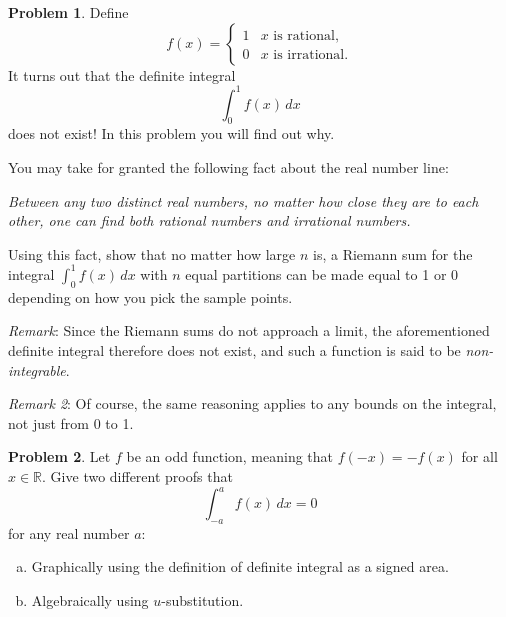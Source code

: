 \documentclass[11pt,oneside]{amsart}
\theoremstyle{definition}
\newtheorem{problem}{Problem}
\newcommand{\bR}{\mathbb{R}}
\begin{document}

    
    \begin{problem}
        Define
        \[f(x)=\begin{cases}1 &\text{$x$ is rational},\\0 &\text{$x$ is irrational}.\end{cases}\]
        It turns out that the definite integral
        \[\int_0^1f(x)\,dx\]
        does not exist! In this problem you will find out why.

        You may take for granted the following fact about the real number line:

        \emph{Between any two distinct real numbers, no matter how close they are to each other, one can find both rational numbers and irrational numbers.}

        Using this fact, show that no matter how large $n$ is, a Riemann sum for the integral $\int_0^1 f(x)\,dx$ with $n$ equal partitions can be made equal to 1 or 0 depending on how you pick the sample points.

        \emph{Remark}: Since the Riemann sums do not approach a limit, the aforementioned definite integral therefore does not exist, and such a function is said to be \emph{non-integrable}.

        \emph{Remark 2}: Of course, the same reasoning applies to any bounds on the integral, not just from 0 to 1. 
    \end{problem}

    \begin{problem}
        Let $f$ be an odd function, meaning that $f(-x)=-f(x)$ for all $x\in\bR$. Give two different proofs that
        \[\int_{-a}^a f(x)\,dx=0\]
        for any real number $a$:
        \begin{enumerate}[(a)]
            \item Graphically using the definition of definite integral as a signed area.
            \item Algebraically using $u$-substitution.
        \end{enumerate}
    \end{problem}
\end{document}
